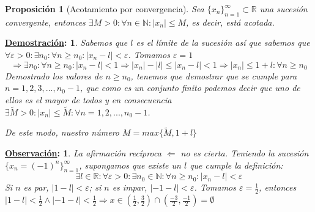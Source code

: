\documentclass[10pt,a4paper,openright]{book}
\theoremstyle{break}
\newtheorem*{prop}{Proposición}
\newtheorem*{demo}{\underline{Demostración}:}
\newtheorem*{obs}{\underline{Observación}:}
\begin{document}
\begin{prop}[Acotamiento por convergencia]
Sea $\{x_n\}_{n=1}^{\infty}\subset \mathbb R$ una sucesión convergente, entonces $\exists M>0: \forall n\in \mathbb N: |x_n|\leq M$, es decir, está acotada.
\end{prop}
\begin{demo}
Sabemos que $l$ es el límite de la sucesión así que sabemos que $\forall \varepsilon>0: \exists n_0: \forall n\geq n_0: |x_n-l|<\varepsilon$. Tomamos $\varepsilon=1$
$$\Rightarrow \exists n_0: \forall n\geq n_0: |x_n-l|<1\Rightarrow |x_n|-|l|\leq |x_n-l|<1\Rightarrow |x_n|\leq 1+l: \forall n\geq n_0$$
Demostrado los valores de $n\geq n_0$, tenemos que demostrar que se cumple para $n=1,2,3,...,n_0-1$, que como es un conjunto finito podemos decir que uno de ellos es el mayor de todos y en consecuencia $\exists \tilde{M}>0: |x_n|\leq \tilde{M}: \forall n=1,2,..., n_0-1$.\par
De este modo, nuestro número $M=max\{\tilde{M}, 1+l\}$
\end{demo}

\begin{obs}
La afirmación recíproca $\Leftarrow$ no es cierta. Teniendo la sucesión $\{x_n=(-1)^n\}_{n=1}^\infty$, supongamos que existe un $l$ que cumple la definición:
$$\exists l \in \mathbb R: \forall \varepsilon>0: \exists n_0\in \mathbb N: \forall n\geq n_0: |x_n-l|<\varepsilon$$
Si $n$ es par, $|1-l|<\varepsilon$; si $n$ es impar, $|-1-l|<\varepsilon$. Tomamos $\varepsilon=\frac{1}{2}$, entonces $|1-l|<\frac{1}{2} \wedge |-1-l|<\frac{1}{2}\Rightarrow x\in (\frac{1}{2}, \frac{3}{2})\cap (\frac{-3}{2}, \frac{-1}{2})=\emptyset$
\end{obs}
\end{document}
